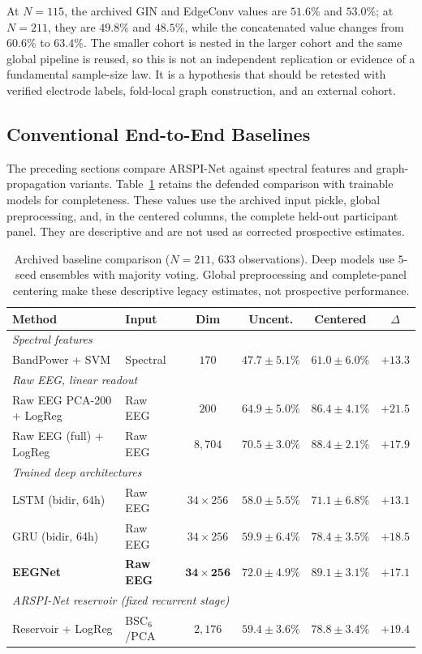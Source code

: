 At $N = 115$, the archived GIN and EdgeConv values are $51.6\%$ and $53.0\%$; at $N = 211$, they are $49.8\%$ and $48.5\%$, while the concatenated value changes from $60.6\%$ to $63.4\%$. The smaller cohort is nested in the larger cohort and the same global pipeline is reused, so this is not an independent replication or evidence of a fundamental sample-size law. It is a hypothesis that should be retested with verified electrode labels, fold-local graph construction, and an external cohort.


\subsection{Conventional End-to-End Baselines}

The preceding sections compare ARSPI-Net against spectral features and graph-propagation variants. Table~\ref{tab:conventional_baselines} retains the defended comparison with trainable models for completeness. These values use the archived input pickle, global preprocessing, and, in the centered columns, the complete held-out participant panel. They are descriptive and are not used as corrected prospective estimates.

\begin{table}[t]
\centering
\caption{Archived baseline comparison ($N = 211$, $633$ observations). Deep models use $5$-seed ensembles with majority voting. Global preprocessing and complete-panel centering make these descriptive legacy estimates, not prospective performance.}
\label{tab:conventional_baselines}
\small
\begin{tabular}{llcccc}
\hline
\textbf{Method} & \textbf{Input} & \textbf{Dim} & \textbf{Uncent.} & \textbf{Centered} & \textbf{$\Delta$} \\
\hline
\multicolumn{6}{l}{\textit{Spectral features}} \\
BandPower + SVM & Spectral & $170$ & $47.7 \pm 5.1\%$ & $61.0 \pm 6.0\%$ & $+13.3$ \\
\hline
\multicolumn{6}{l}{\textit{Raw EEG, linear readout}} \\
Raw EEG PCA-200 + LogReg & Raw EEG & $200$ & $64.9 \pm 5.0\%$ & $86.4 \pm 4.1\%$ & $+21.5$ \\
Raw EEG (full) + LogReg & Raw EEG & $8{,}704$ & $70.5 \pm 3.0\%$ & $88.4 \pm 2.1\%$ & $+17.9$ \\
\hline
\multicolumn{6}{l}{\textit{Trained deep architectures}} \\
LSTM (bidir, 64h) & Raw EEG & $34 \times 256$ & $58.0 \pm 5.5\%$ & $71.1 \pm 6.8\%$ & $+13.1$ \\
GRU (bidir, 64h) & Raw EEG & $34 \times 256$ & $59.9 \pm 6.4\%$ & $78.4 \pm 3.5\%$ & $+18.5$ \\
\textbf{EEGNet} & \textbf{Raw EEG} & $\mathbf{34 \times 256}$ & $\mathbf{72.0 \pm 4.9\%}$ & $\mathbf{89.1 \pm 3.1\%}$ & $\mathbf{+17.1}$ \\
\hline
\multicolumn{6}{l}{\textit{ARSPI-Net reservoir (fixed recurrent stage)}} \\
Reservoir + LogReg & BSC$_6$/PCA & $2{,}176$ & $59.4 \pm 3.6\%$ & $78.8 \pm 3.4\%$ & $+19.4$ \\
\hline
\end{tabular}
\end{table}


